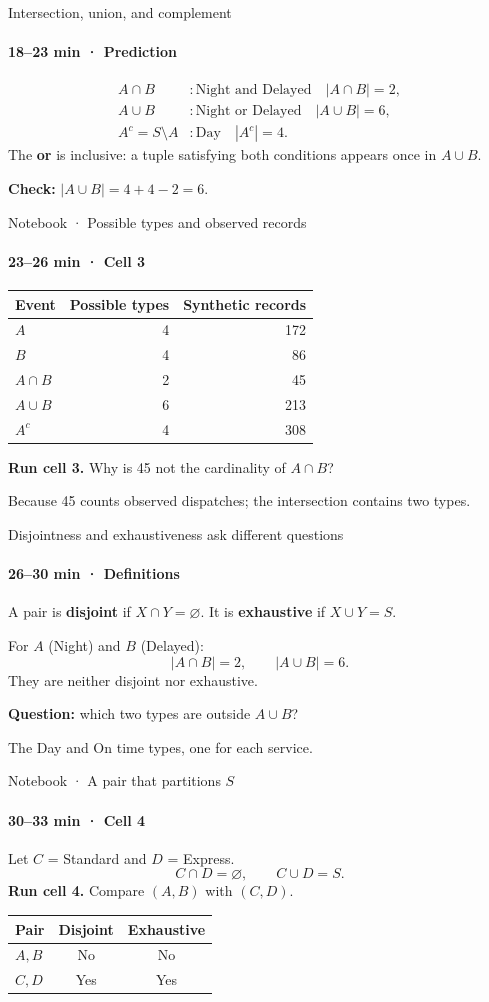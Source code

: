 \documentclass[aspectratio=169,11pt,english]{beamer}
\begin{document}
\begin{frame}{Intersection, union, and complement}
\framesubtitle{18–23 min · Prediction}
\[
\begin{array}{ll}
A\cap B &: \text{Night and Delayed}\quad |A\cap B|=2,\\[3pt]
A\cup B &: \text{Night or Delayed}\quad |A\cup B|=6,\\[3pt]
A^c=S\setminus A &: \text{Day}\quad |A^c|=4.
\end{array}
\]
The \textbf{or} is inclusive: a tuple satisfying both conditions appears once in $A\cup B$.

\medskip
\textbf{Check:} $|A\cup B|=4+4-2=6$.
\end{frame}
\begin{frame}{Notebook · Possible types and observed records}
\framesubtitle{23–26 min · Cell 3}
\centering
\begin{tabular}{lrr}
\toprule Event & Possible types & Synthetic records\\ \midrule
$A$ & 4 & 172\\
$B$ & 4 & 86\\
$A\cap B$ & 2 & 45\\
$A\cup B$ & 6 & 213\\
$A^c$ & 4 & 308\\ \bottomrule
\end{tabular}
\par\medskip\raggedright
\textbf{Run cell 3.} Why is 45 not the cardinality of $A\cap B$?

\medskip
Because 45 counts observed dispatches; the intersection contains two types.
\end{frame}
\begin{frame}{Disjointness and exhaustiveness ask different questions}
\framesubtitle{26–30 min · Definitions}
A pair is \textbf{disjoint} if $X\cap Y=\varnothing$. It is \textbf{exhaustive} if $X\cup Y=S$.

\medskip
For $A$ (Night) and $B$ (Delayed):
\[
|A\cap B|=2,\qquad |A\cup B|=6.
\]
They are neither disjoint nor exhaustive.

\medskip
\textbf{Question:} which two types are outside $A\cup B$?

\medskip
The Day and On time types, one for each service.
\end{frame}
\begin{frame}{Notebook · A pair that partitions $S$}
\framesubtitle{30–33 min · Cell 4}
Let $C$ = Standard and $D$ = Express.
\[
C\cap D=\varnothing,\qquad C\cup D=S.
\]
\textbf{Run cell 4.} Compare $(A,B)$ with $(C,D)$.

\medskip
\centering
\begin{tabular}{lcc}
\toprule Pair & Disjoint & Exhaustive\\ \midrule
$A,B$ & No & No\\
$C,D$ & Yes & Yes\\ \bottomrule
\end{tabular}
\end{frame}
\end{document}
